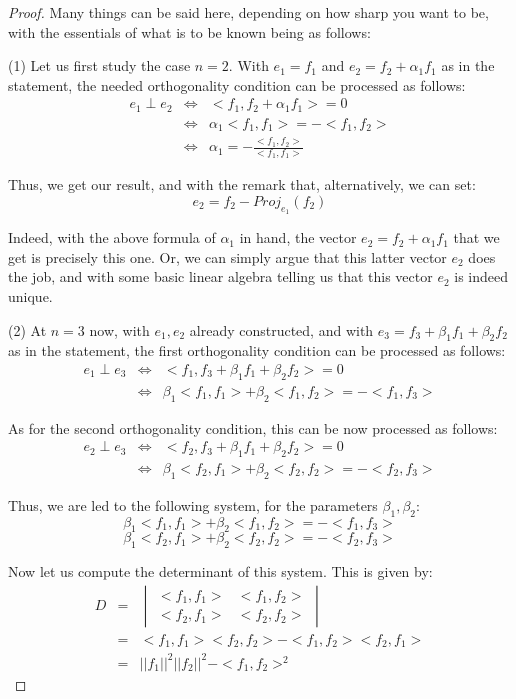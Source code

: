 \documentclass[12pt]{amsbook}
\begin{document}
\begin{proof}
Many things can be said here, depending on how sharp you want to be, with the essentials of what is to be known being as follows:

\medskip

(1) Let us first study the case $n=2$. With $e_1=f_1$ and $e_2=f_2+\alpha_1f_1$ as in the statement, the needed orthogonality condition can be processed as follows:
\begin{eqnarray*}
e_1\perp e_2
&\iff&<f_1,f_2+\alpha_1f_1>=0\\
&\iff&\alpha_1<f_1,f_1>=-<f_1,f_2>\\
&\iff&\alpha_1=-\frac{<f_1,f_2>}{<f_1,f_1>}
\end{eqnarray*}

Thus, we get our result, and with the remark that, alternatively, we can set:
$$e_2=f_2-Proj_{e_1}(f_2)$$

Indeed, with the above formula of $\alpha_1$ in hand, the vector $e_2=f_2+\alpha_1f_1$ that we get is precisely this one. Or, we can simply argue that this latter vector $e_2$ does the job, and with some basic linear algebra telling us that this vector $e_2$ is indeed unique.

\medskip 

(2) At $n=3$ now, with $e_1,e_2$ already constructed, and with $e_3=f_3+\beta_1f_1+\beta_2f_2$ as in the statement, the first orthogonality condition can be processed as follows:
\begin{eqnarray*}
e_1\perp e_3
&\iff&<f_1,f_3+\beta_1f_1+\beta_2f_2>=0\\
&\iff&\beta_1<f_1,f_1>+\beta_2<f_1,f_2>=-<f_1,f_3>
\end{eqnarray*}

As for the second orthogonality condition, this can be now processed as follows:
\begin{eqnarray*}
e_2\perp e_3
&\iff&<f_2,f_3+\beta_1f_1+\beta_2f_2>=0\\
&\iff&\beta_1<f_2,f_1>+\beta_2<f_2,f_2>=-<f_2,f_3>
\end{eqnarray*}

Thus, we are led to the following system, for the parameters $\beta_1,\beta_2$:
$$\beta_1<f_1,f_1>+\beta_2<f_1,f_2>=-<f_1,f_3>$$
$$\beta_1<f_2,f_1>+\beta_2<f_2,f_2>=-<f_2,f_3>$$

Now let us compute the determinant of this system. This is given by:
\begin{eqnarray*}
D
&=&\begin{vmatrix}
<f_1,f_1>&<f_1,f_2>\\
<f_2,f_1>&<f_2,f_2>
\end{vmatrix}\\
&=&<f_1,f_1><f_2,f_2>-<f_1,f_2><f_2,f_1>\\
&=&||f_1||^2||f_2||^2-<f_1,f_2>^2
\end{eqnarray*}


\end{proof}
\end{document}
